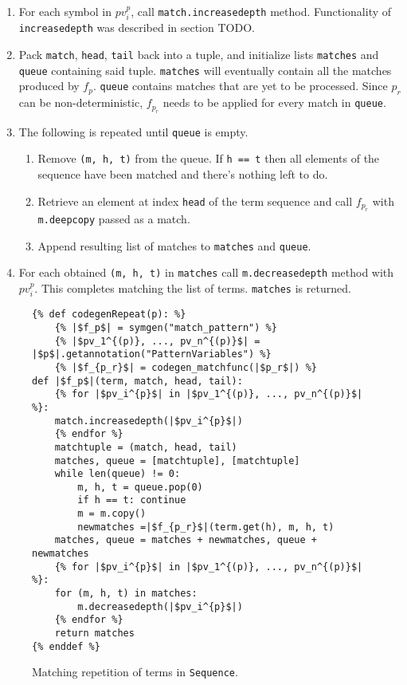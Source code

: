 \begin{enumerate}
\item
For each symbol in $pv_i^{p}$, call \texttt{match.increasedepth} method. Functionality of \texttt{increasedepth} was described in section TODO. 
\item
Pack \texttt{match}, \texttt{head}, \texttt{tail} back into a tuple, and initialize lists \texttt{matches} and \texttt{queue} containing said tuple. \texttt{matches} will eventually contain all the matches produced by $f_p$. \texttt{queue} contains matches that are yet to be processed. Since $p_r$ can be non-deterministic, $f_{p_r}$ needs to be applied for every match in \texttt{queue}. 
\item The following is repeated until \texttt{queue} is empty. 
	\begin{enumerate}
	\item 
	Remove \texttt{(m, h, t)} from the queue. If \texttt{h == t} then all elements of the sequence have been matched and there's nothing left to do.  	
	\item
	Retrieve an element at index \texttt{head} of the term sequence and call $f_{p_r}$ with \texttt{m.deepcopy} passed as a match.
	\item Append resulting list of matches to \texttt{matches} and \texttt{queue}.
	\end{enumerate}

\item
For each obtained \texttt{(m, h, t)} in \texttt{matches} call \texttt{m.decreasedepth} method with $pv_i^{p}$. This completes matching the list of terms. \texttt{matches} is returned.
\end{enumerate}

\begin{figure}
\begin{verbatim}
{% def codegenRepeat(p): %}
	{% |$f_p$| = symgen("match_pattern") %}
	{% |$pv_1^{(p)}, ..., pv_n^{(p)}$| = |$p$|.getannotation("PatternVariables") %}
	{% |$f_{p_r}$| = codegen_matchfunc(|$p_r$|) %}
def |$f_p$|(term, match, head, tail):
	{% for |$pv_i^{p}$| in |$pv_1^{(p)}, ..., pv_n^{(p)}$| %}:
	match.increasedepth(|$pv_i^{p}$|)
	{% endfor %}
	matchtuple = (match, head, tail)
	matches, queue = [matchtuple], [matchtuple]
	while len(queue) != 0:
		m, h, t = queue.pop(0)
		if h == t: continue
		m = m.copy()
		newmatches =|$f_{p_r}$|(term.get(h), m, h, t)
	matches, queue = matches + newmatches, queue + newmatches 
	{% for |$pv_i^{p}$| in |$pv_1^{(p)}, ..., pv_n^{(p)}$| %}:
	for (m, h, t) in matches: 
		m.decreasedepth(|$pv_i^{p}$|)
	{% endfor %}
	return matches
{% enddef %}
\end{verbatim}
\caption{Matching repetition of terms \RepeatNoArg \space in \texttt{Sequence}.}
\label{codegen-pattern-ellipsis-1}
\end{figure}


